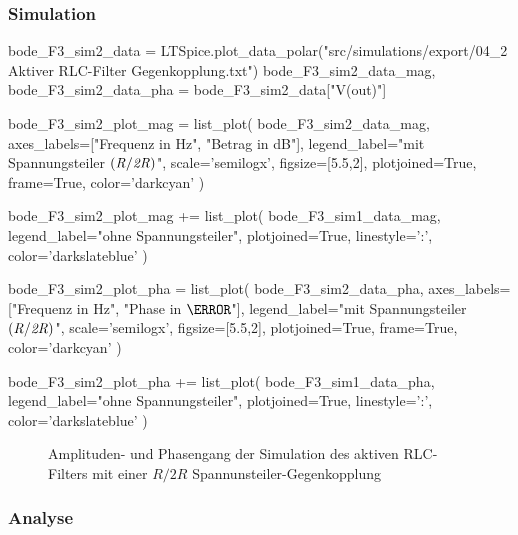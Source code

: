 \subsubsection{Simulation}

\begin{sagesilent}
    bode_F3_sim2_data = LTSpice.plot_data_polar("src/simulations/export/04_2 Aktiver RLC-Filter Gegenkopplung.txt")
    bode_F3_sim2_data_mag, bode_F3_sim2_data_pha = bode_F3_sim2_data["V(out)"]

    bode_F3_sim2_plot_mag = list_plot(
        bode_F3_sim2_data_mag,
        axes_labels=["Frequenz in Hz", "Betrag in dB"],
        legend_label="mit Spannungsteiler $\it{(R/2R)}$",
        scale='semilogx',
        figsize=[5.5,2],
        plotjoined=True,
        frame=True,
        color='darkcyan'
    )

    bode_F3_sim2_plot_mag += list_plot(
        bode_F3_sim1_data_mag,
        legend_label="ohne Spannungsteiler",
        plotjoined=True,
        linestyle=':',
        color='darkslateblue'
    )

    bode_F3_sim2_plot_pha = list_plot(
        bode_F3_sim2_data_pha,
        axes_labels=["Frequenz in Hz", "Phase in $\degree$"],
        legend_label="mit Spannungsteiler $\it{(R/2R)}$",
        scale='semilogx',
        figsize=[5.5,2],
        plotjoined=True,
        frame=True,
        color='darkcyan'
    )

    bode_F3_sim2_plot_pha += list_plot(
        bode_F3_sim1_data_pha,
        legend_label="ohne Spannungsteiler",
        plotjoined=True,
        linestyle=':',
        color='darkslateblue'
    )
\end{sagesilent}

\begin{figure}[H]
    \centering
    \begin{subfigure}{\textwidth}
        \centering
    \end{subfigure}
    \quad
    \begin{subfigure}{\textwidth}
        \centering
    \end{subfigure}
    \caption{Amplituden- und Phasengang der Simulation des aktiven RLC-Filters mit einer $R/2R$ Spannunsteiler-Gegenkopplung}
    \label{fig:F3_Sim2}
\end{figure}

\subsubsection{Analyse}

